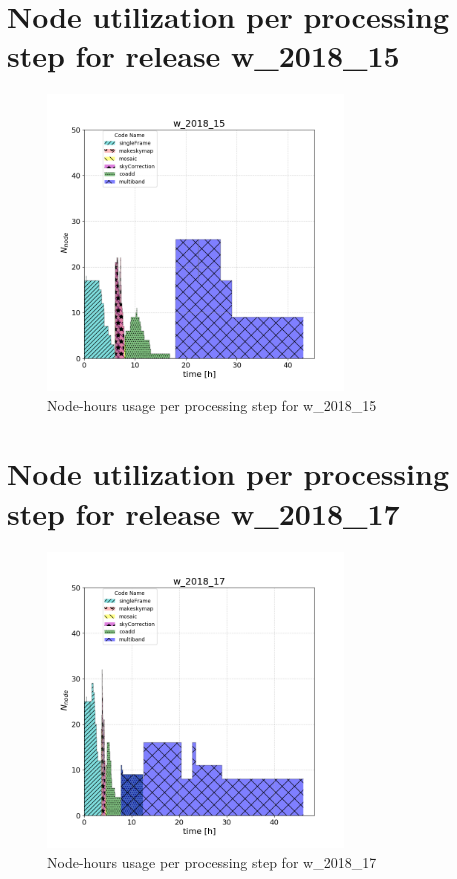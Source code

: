 \clearpage
\section{Node utilization per processing step for release w\_2018\_15}

\begin{figure}[h]
  \centering
  \includegraphics[width=0.70\textwidth]{figures/usage-w_2018_15.png}
  \caption{Node-hours usage per processing step for w\_2018\_15}
  \label{fig:PerTask15}
\end{figure}


\clearpage
\section{Node utilization per processing step for release w\_2018\_17}

\begin{figure}[h]
  \centering
  \includegraphics[width=0.70\textwidth]{figures/usage-w_2018_17.png}
  \caption{Node-hours usage per processing step for w\_2018\_17}
  \label{fig:PerTask17}
\end{figure}


